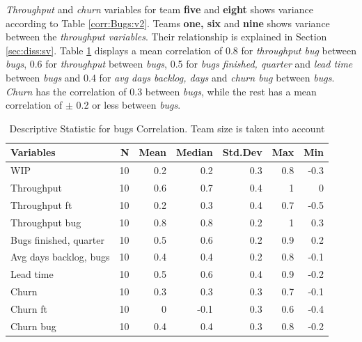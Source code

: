 \documentclass[UKenglish]{ifimaster}  %
\begin{document}
\textit{Throughput} and \textit{churn} variables for team \textbf{five} and \textbf{eight} shows variance according to Table \ref{corr:Bugs:v2}.  Teams \textbf{one, six} and \textbf{nine} shows variance between the \textit{throughput variables}. Their relationship is explained in Section \ref{sec:diss:sv}. Table \ref{DS:corr:Bugs:v2} displays a mean correlation of 0.8  for \textit{throughput bug} between \textit{bugs}, 0.6 for \textit{throughput} between \textit{bugs}, 0.5 for \textit{bugs finished, quarter} and \textit{lead time} between \textit{bugs} and 0.4 for \textit{avg days backlog, days} and \textit{churn bug} between \textit{bugs}. \textit{Churn} has the correlation of 0.3 between \textit{bugs}, while the rest has a mean correlation of $\pm$ 0.2 or less between \textit{bugs}.

\FloatBarrier
\begin{table}[H]
 \caption{Descriptive Statistic for bugs Correlation. Team size is taken into account}
 \centering
 \begin{tabular}{ | l | r | r | r | r | r | r | }
 \hline
\textbf{Variables}& \bf{N} & \bf{Mean} & \bf{Median} & \bf{Std.Dev} & \bf{Max} & \bf{Min} \\ \hline
WIP  & 10 & 0.2 & 0.2 & 0.3 & 0.8 & -0.3\\ \hline
Throughput  & 10 & 0.6 & 0.7 & 0.4 & 1 & 0\\ \hline
Throughput ft  & 10 & 0.2 & 0.3 & 0.4 & 0.7 & -0.5\\ \hline
Throughput bug  & 10 & 0.8 & 0.8 & 0.2 & 1 & 0.3\\ \hline
Bugs finished, quarter  & 10 & 0.5 & 0.6 & 0.2 & 0.9 & 0.2\\ \hline
Avg days backlog, bugs  & 10 & 0.4 & 0.4 & 0.2 & 0.8 & -0.1\\ \hline
Lead time & 10 & 0.5 & 0.6 & 0.4 & 0.9 & -0.2\\ \hline
Churn  & 10 & 0.3 & 0.3 & 0.3 & 0.7 & -0.1\\ \hline
Churn ft  & 10 & 0 & -0.1 & 0.3 & 0.6 & -0.4\\ \hline
Churn bug  & 10 & 0.4 & 0.4 & 0.3 & 0.8 & -0.2\\ \hline
\end{tabular}
 \label{DS:corr:Bugs:v2}
 \end{table}
\end{document}
